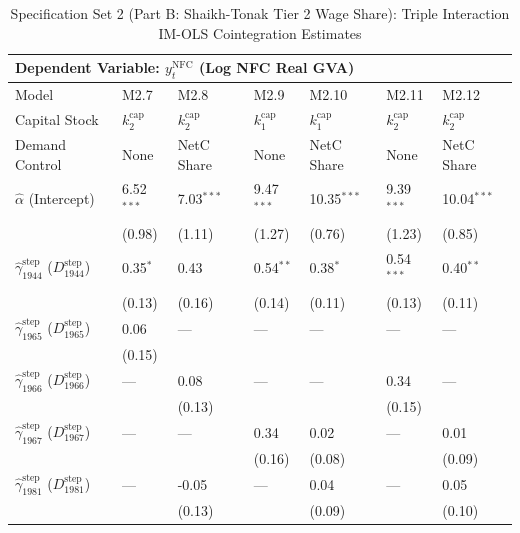 \begin{table}[H]
\centering
\caption{Specification Set 2 (Part B: Shaikh-Tonak Tier 2 Wage Share): Triple Interaction IM-OLS Cointegration Estimates}
\label{tab:spec_set_2_b}
\scriptsize
\begin{tabular}{p{3.8cm}p{1.35cm}p{1.35cm}p{1.35cm}p{1.35cm}p{1.35cm}p{1.35cm}}
\toprule
\multicolumn{7}{l}{\textbf{Dependent Variable: $y_t^{\text{NFC}}$ (Log NFC Real GVA)}} \\
\midrule
Model & M2.7 & M2.8 & M2.9 & M2.10 & M2.11 & M2.12  \\
Capital Stock & $k^{\text{cap}}_2$ & $k^{\text{cap}}_2$ & $k^{\text{cap}}_1$ & $k^{\text{cap}}_1$ & $k^{\text{cap}}_2$ & $k^{\text{cap}}_2$  \\
Demand Control & None & NetC Share & None & NetC Share & None & NetC Share  \\
\midrule
$\hat{\alpha}$ (Intercept)  & 6.52$^{***}$ & 7.03$^{***}$ & 9.47$^{***}$ & 10.35$^{***}$ & 9.39$^{***}$ & 10.04$^{***}$  \\
 & {\scriptsize (0.98)} & {\scriptsize (1.11)} & {\scriptsize (1.27)} & {\scriptsize (0.76)} & {\scriptsize (1.23)} & {\scriptsize (0.85)}  \\
$\hat{\gamma}^{\text{step}}_{1944}$ ($D^{\text{step}}_{1944}$)  & 0.35$^{*}$ & 0.43 & 0.54$^{**}$ & 0.38$^{*}$ & 0.54$^{***}$ & 0.40$^{**}$  \\
 & {\scriptsize (0.13)} & {\scriptsize (0.16)} & {\scriptsize (0.14)} & {\scriptsize (0.11)} & {\scriptsize (0.13)} & {\scriptsize (0.11)}  \\
$\hat{\gamma}^{\text{step}}_{1965}$ ($D^{\text{step}}_{1965}$)  & 0.06 & --- & --- & --- & --- & ---  \\
 & {\scriptsize (0.15)} &  &  &  &  &   \\
$\hat{\gamma}^{\text{step}}_{1966}$ ($D^{\text{step}}_{1966}$)  & --- & 0.08 & --- & --- & 0.34 & ---  \\
 &  & {\scriptsize (0.13)} &  &  & {\scriptsize (0.15)} &   \\
$\hat{\gamma}^{\text{step}}_{1967}$ ($D^{\text{step}}_{1967}$)  & --- & --- & 0.34 & 0.02 & --- & 0.01  \\
 &  &  & {\scriptsize (0.16)} & {\scriptsize (0.08)} &  & {\scriptsize (0.09)}  \\
$\hat{\gamma}^{\text{step}}_{1981}$ ($D^{\text{step}}_{1981}$)  & --- & -0.05 & --- & 0.04 & --- & 0.05  \\
 &  & {\scriptsize (0.13)} &  & {\scriptsize (0.09)} &  & {\scriptsize (0.10)}  \\

\end{tabular}
\end{table}
